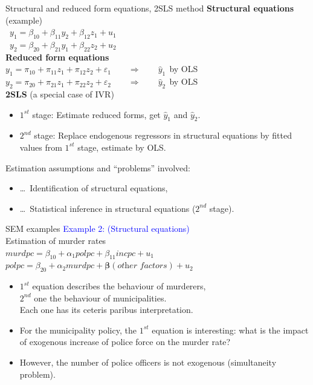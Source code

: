 \documentclass[usenames,dvipsnames]{beamer}
\begin{document}
\begin{frame}{Structural and reduced form equations, 2SLS method}
\textbf{Structural equations} (example)\\
\medskip
\quad \ $y_1  = \beta_{10} + \beta_{11} y_2 + \beta_{12} z_1 + u_1 $ \\
\medskip
\quad \ $y_2  = \beta_{20}+\beta_{21} y_1 + \beta_{22} z_2 + u_2 $ \\
\bigskip
\textbf{Reduced form equations}\\
\medskip
\quad $y_1 = \pi_{10} + \pi_{11} z_1 + \pi_{12} z_2 + \varepsilon_1 \qquad 
\Rightarrow  \qquad \hat{y}_1~~$by OLS\\
\medskip
\quad $y_2 = \pi_{20} + \pi_{21} z_1 + \pi_{22} z_2 + \varepsilon_2 \qquad 
\Rightarrow  \qquad \hat{y}_2~~$by OLS\\
\bigskip
\textbf{2SLS} (a special case of IVR)\\
\begin{itemize}
\item $1^{st}$ stage: Estimate reduced forms, get $\hat{y}_1$ and $\hat{y}_2$.
\item $2^{nd}$ stage: Replace endogenous regressors in structural equations by fitted values from $1^{st}$ stage, estimate by OLS.\\
\end{itemize}
\medskip
Estimation assumptions and ``problems'' involved:
\begin{itemize}
\item[] \dots ~Identification of structural equations, \\
\item[] \dots ~Statistical inference in structural equations ($2^{nd}$ stage).
\end{itemize}
\end{frame}
\begin{frame}{SEM examples}
\textcolor{Blue}{Example 2: (Structural equations)} \\Estimation of murder rates\\
\medskip
\qquad $\textit{murdpc} = \beta_{10} + \alpha_1 \textit{polpc} +  \beta_{11} \textit{incpc} + u_1$ \\
\qquad \hspace{0.25cm} $\textit{polpc} = \beta_{20} + \alpha_2 \textit{murdpc} + \bm{\beta} (\textit{other factors}) + u_2$ \\
\medskip
\begin{itemize}
\item $1^{st}$ equation describes the behaviour of murderers, \\$2^{nd}$ one the behaviour of municipalities. \\Each one has its ceteris paribus interpretation.\\
\medskip
\item For the municipality policy, the $1^{st}$ equation is interesting: what is the impact of exogenous increase of police force on the murder rate? 
\item However, the number of police officers  is not exogenous (simultaneity problem). 
\end{itemize}
\end{frame}
\end{document}
